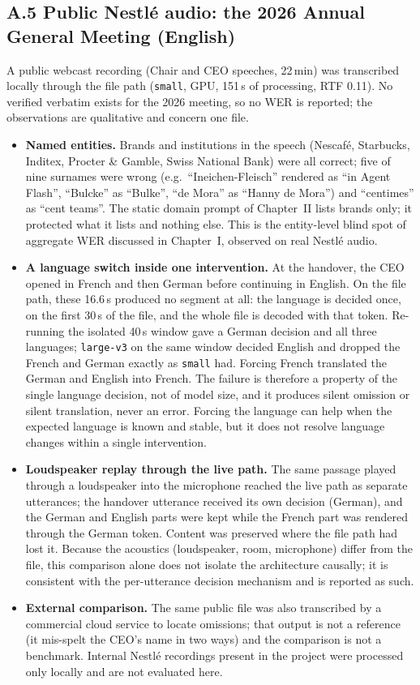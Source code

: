 \subsection*{A.5 Public Nestlé audio: the 2026 Annual General Meeting (English)}
A public webcast recording (Chair and CEO speeches, 22\,min) was transcribed locally through the file path
(\texttt{small}, GPU, 151\,s of processing, RTF 0.11). No verified verbatim exists for the 2026 meeting, so no
WER is reported; the observations are qualitative and concern one file.
\begin{itemize}
  \item \textbf{Named entities.} Brands and institutions in the speech (Nescafé, Starbucks, Inditex, Procter \&
  Gamble, Swiss National Bank) were all correct; five of nine surnames were wrong (e.g.\ ``Ineichen-Fleisch''
  rendered as ``in Agent Flash'', ``Bulcke'' as ``Bulke'', ``de Mora'' as ``Hanny de Mora'') and ``centimes'' as
  ``cent teams''. The static domain prompt of Chapter~II lists brands only; it protected what it lists and nothing
  else. This is the entity-level blind spot of aggregate WER discussed in Chapter~I, observed on real Nestlé audio.
  \item \textbf{A language switch inside one intervention.} At the handover, the CEO opened in French and then
  German before continuing in English. On the file path, these 16.6\,s produced no segment at all: the language
  is decided once, on the first 30\,s of the file, and the whole file is decoded with that token. Re-running the
  isolated 40\,s window gave a German decision and all three languages; \texttt{large-v3} on the same window
  decided English and dropped the French and German exactly as \texttt{small} had. Forcing French translated the
  German and English into French. The failure is therefore a property of the single language decision, not of
  model size, and it produces silent omission or silent translation, never an error. Forcing the language can help when the expected language is known and stable, but it does not resolve language changes within a single intervention.
  \item \textbf{Loudspeaker replay through the live path.} The same passage played through a loudspeaker into
  the microphone reached the live path as separate utterances; the handover utterance received its own decision
  (German), and the German and English parts were kept while the French part was rendered through the German
  token. Content was preserved where the file path had lost it. Because the acoustics (loudspeaker, room,
  microphone) differ from the file, this comparison alone does not isolate the architecture causally; it is
  consistent with the per-utterance decision mechanism and is reported as such.
  \item \textbf{External comparison.} The same public file was also transcribed by a commercial cloud service to
  locate omissions; that output is not a reference (it mis-spelt the CEO's name in two ways) and the comparison is
  not a benchmark. Internal Nestlé recordings present in the project were processed only locally and are not
  evaluated here.
\end{itemize}

